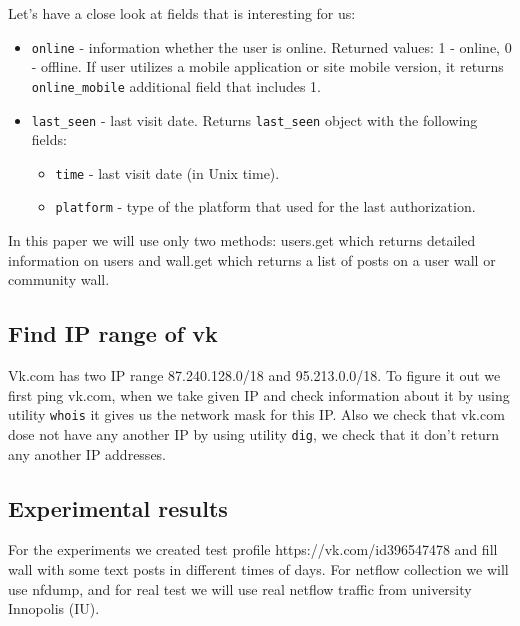 Let’s have a close look at fields that is interesting for us:
\begin{itemize}
	\item{\texttt{online} - information whether the user is online.  Returned values: 1 - online, 0 - offline.  If user utilizes a mobile application or site mobile version, it returns \texttt{online{\_}mobile} additional field that includes 1.}  
	\item{\texttt{last{\_}seen}	 - last visit date.  Returns \texttt{last{\_}seen} object with the following fields:
	\begin{itemize}
		\item{\texttt{time} - last visit date (in Unix time).}
		\item{\texttt{platform} - type of the platform that used for the last authorization.}
	\end{itemize}}
\end{itemize}

In this paper we will use only two methods: users.get which returns detailed information on users and wall.get which returns a list of posts on a user wall or community wall.


\subsection{Find IP range of vk}
Vk.com has two IP range 87.240.128.0/18 and 95.213.0.0/18. To figure it out we first ping vk.com, when we take given IP and check information about it by using utility \texttt{whois} it gives us the network mask for this IP. Also we check that vk.com dose not have any another IP by using utility \texttt{dig}, we check that it don't return any another IP addresses.


\subsection{Experimental results}
For the experiments we created test profile https://vk.com/id396547478 and fill wall with some text posts in different times of days. For netflow collection we will use nfdump\cite{nfdump}, and for real test we will use real netflow traffic from university Innopolis (IU). 

